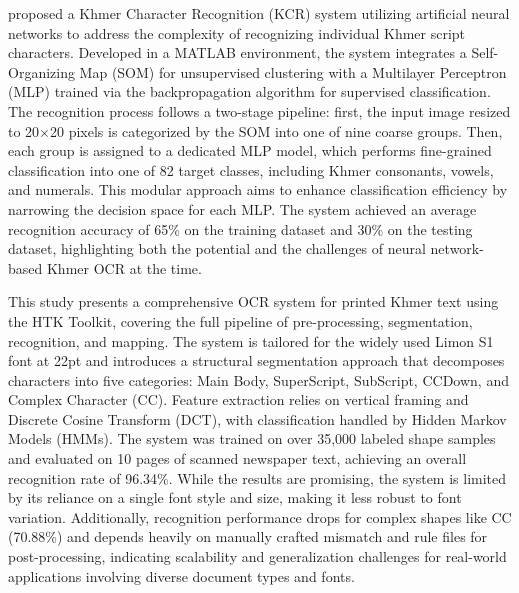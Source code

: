 \citet{Meng_Hann_2014} proposed a Khmer Character Recognition (KCR) 
system utilizing artificial neural networks to address the complexity 
of recognizing individual Khmer script characters. Developed in a 
MATLAB environment, the system integrates a Self-Organizing Map (SOM) 
for unsupervised clustering with a Multilayer Perceptron (MLP) 
trained via the backpropagation algorithm for supervised classification. 
The recognition process follows a two-stage pipeline: first, the input 
image resized to 20×20 pixels is categorized by the SOM into one of 
nine coarse groups. Then, each group is assigned to a dedicated MLP 
model, which performs fine-grained classification into one of 82 
target classes, including Khmer consonants, vowels, and numerals. 
This modular approach aims to enhance classification efficiency by 
narrowing the decision space for each MLP. The system achieved an 
average recognition accuracy of 65\% on the training dataset and 
30\% on the testing dataset, highlighting both the potential and 
the challenges of neural network-based Khmer OCR at the time.

\citet{Muaz2015} This study presents a comprehensive OCR system for 
printed Khmer text using the HTK Toolkit, covering the full 
pipeline of pre-processing, segmentation, recognition, and mapping. 
The system is tailored for the widely used Limon S1 font at 22pt and 
introduces a structural segmentation approach that decomposes 
characters into five categories: Main Body, SuperScript, SubScript, 
CCDown, and Complex Character (CC). Feature extraction relies on 
vertical framing and Discrete Cosine Transform (DCT), with 
classification handled by Hidden Markov Models (HMMs). 
The system was trained on over 35,000 labeled shape samples and 
evaluated on 10 pages of scanned newspaper text, achieving an 
overall recognition rate of 96.34\%. While the results are promising, 
the system is limited by its reliance on a single font style and size, 
making it less robust to font variation. Additionally, recognition 
performance drops for complex shapes like CC (70.88\%) and depends 
heavily on manually crafted mismatch and rule files for post-processing, 
indicating scalability and generalization challenges for real-world 
applications involving diverse document types and fonts.

